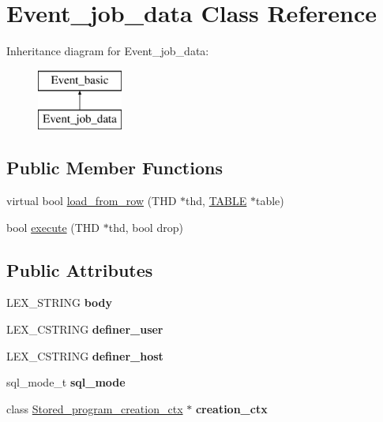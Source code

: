 \hypertarget{classEvent__job__data}{}\section{Event\+\_\+job\+\_\+data Class Reference}
\label{classEvent__job__data}
Inheritance diagram for Event\+\_\+job\+\_\+data\+:\begin{figure}[H]
\begin{center}
\leavevmode
\includegraphics[height=2.000000cm]{classEvent__job__data}
\end{center}
\end{figure}
\subsection*{Public Member Functions}
\begin{DoxyCompactItemize}
\item 
virtual bool \mbox{\hyperlink{group__Event__Scheduler_gab1ac4ae01202ed7bd65cf20736a95ebd}{load\+\_\+from\+\_\+row}} (T\+HD $\ast$thd, \mbox{\hyperlink{structTABLE}{T\+A\+B\+LE}} $\ast$table)
\item 
bool \mbox{\hyperlink{group__Event__Scheduler_gaeb3f7011c6b8ec77e148d46e691011a5}{execute}} (T\+HD $\ast$thd, bool drop)
\end{DoxyCompactItemize}
\subsection*{Public Attributes}
\begin{DoxyCompactItemize}
\item 
\mbox{\label{classEvent__job__data_a23d7a59e82837a213f958ec9749191b9}} 
L\+E\+X\+\_\+\+S\+T\+R\+I\+NG {\bfseries body}
\item 
\mbox{\label{classEvent__job__data_a2d4f41283aa336ac835b22032fd63f63}} 
L\+E\+X\+\_\+\+C\+S\+T\+R\+I\+NG {\bfseries definer\+\_\+user}
\item 
\mbox{\label{classEvent__job__data_a0053ffb31a3a6cc0860587e1c32d5914}} 
L\+E\+X\+\_\+\+C\+S\+T\+R\+I\+NG {\bfseries definer\+\_\+host}
\item 
\mbox{\label{classEvent__job__data_a282585cfe4972f96f8eb872a247f2c78}} 
sql\+\_\+mode\+\_\+t {\bfseries sql\+\_\+mode}
\item 
\mbox{\label{classEvent__job__data_a858ed9a393981d3605e13c8cd2504ed9}} 
class \mbox{\hyperlink{classStored__program__creation__ctx}{Stored\+\_\+program\+\_\+creation\+\_\+ctx}} $\ast$ {\bfseries creation\+\_\+ctx}
\end{DoxyCompactItemize}
